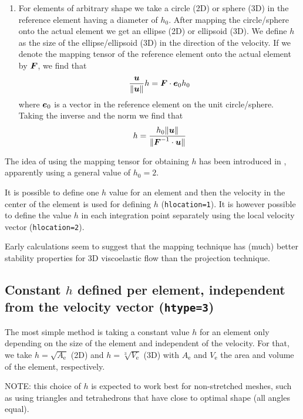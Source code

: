 \begin{enumerate}
          get: $h_0=2$ for quadrilaterals and hexahedra, $h_0=\sqrt[4]{3}/2$ for
          triangles, $h_0=(\sqrt{2}/12)^{\frac13}$ for tetrahedra, 
          $h_0=(\sqrt{3}/2)^{\frac13}$ for prisms and $h_0=\sqrt[3]{4}$ for pyramids.
   \item For elements of arbitrary shape we take a circle (2D) or sphere (3D)
         in the reference element having a diameter of $h_0$. After mapping 
         the circle/sphere onto the actual element we get an ellipse (2D) or
         ellipsoid (3D). We define
         $h$ as the size of the ellipse/ellipsoid (3D) in the
         direction of the velocity. If we denote the
         mapping tensor of the reference element onto the actual element
         by $\boldsymbol{F}$, we find that
         \[
            \frac{\boldsymbol{u}}{\|\boldsymbol{u}\|} h= \boldsymbol{F}\cdot \boldsymbol{e}_0h_0 
         \]
         where $\boldsymbol{e}_0$ is a vector in the reference element on the unit
         circle/sphere. Taking the inverse and the norm we find that
         \[
             h= \frac{h_0\|\boldsymbol{u}\|}{ \|\boldsymbol{F}^{-1}\cdot\boldsymbol{u}\|}
         \]
\end{enumerate}
The idea of using the mapping tensor for obtaining $h$ has been introduced in
\cite{Hughes86}, apparently using a general value of $h_0=2$.

It is possible to define one $h$ value for an element and then the velocity in the center of the element is used for defining $h$ (\texttt{hlocation=1}).
It is however possible to define the value $h$ in each integration point separately using the
local velocity vector (\texttt{hlocation=2}). 

Early calculations seem to suggest that the mapping
technique has (much) better stability properties for 3D viscoelastic flow than
the projection technique.

\subsection{Constant $h$ defined per element, independent from the velocity vector (\texttt{htype=3})}

The most simple method is taking a constant value $h$ for an element only depending on the size of the element and independent of the velocity. For that, we take  $h=\sqrt{A_\text{e}}$ (2D) and $h=\sqrt[3]{V_\text{e}}$ (3D) with
$A_\text{e}$ and $V_\text{e}$ the area and volume of the element, respectively.

NOTE: this choice of $h$ is expected to work best for non-stretched meshes, such as using triangles and tetrahedrons that have close to optimal shape (all angles equal).

